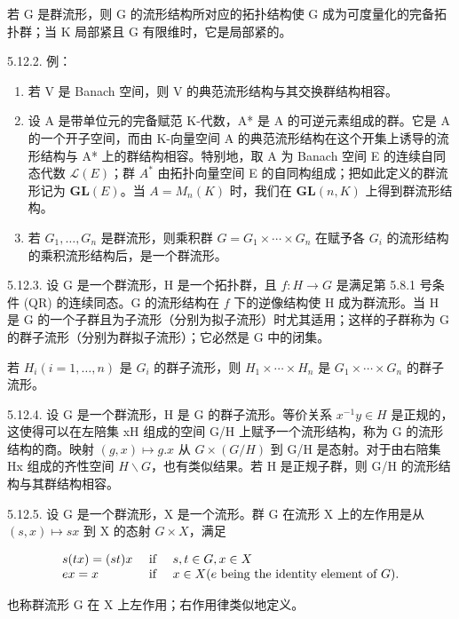 若 G 是群流形，则 G 的流形结构所对应的拓扑结构使 G 成为可度量化的完备拓扑群；当 K 局部紧且 G 有限维时，它是局部紧的。

5.12.2. 例：

\begin{enumerate}
\def\labelenumi{(\roman{enumi})}
\item
  若 V 是 Banach 空间，则 V 的典范流形结构与其交换群结构相容。
\item
  设 A 是带单位元的完备赋范 K-代数，A* 是 A 的可逆元素组成的群。它是 A 的一个开子空间，而由 K-向量空间 A 的典范流形结构在这个开集上诱导的流形结构与 A* 上的群结构相容。特别地，取 A 为 Banach 空间 E 的连续自同态代数 \(\mathcal{L}(E)\)；群 \(A^{*}\) 由拓扑向量空间 E 的自同构组成；把如此定义的群流形记为 \(\mathbf{GL}(E)\)。当 \(A = M_{n}(K)\) 时，我们在 \(\mathbf{GL}(n, K)\) 上得到群流形结构。
\item
  若 \(G_{1},\ldots,G_{n}\) 是群流形，则乘积群 \(G=G_{1}\times\cdots\times G_{n}\) 在赋予各 \(G_{i}\) 的流形结构的乘积流形结构后，是一个群流形。
\end{enumerate}

5.12.3. 设 G 是一个群流形，H 是一个拓扑群，且 \(f:H\to G\) 是满足第 5.8.1 号条件 (QR) 的连续同态。G 的流形结构在 \(f\) 下的逆像结构使 H 成为群流形。当 H 是 G 的一个子群且为子流形（分别为拟子流形）时尤其适用；这样的子群称为 G 的群子流形（分别为群拟子流形）；它必然是 G 中的闭集。

若 \(H_{i}(i=1,\ldots,n)\) 是 \(G_{i}\) 的群子流形，则 \(H_{1}\times\cdots\times H_{n}\) 是 \(G_{1}\times\cdots\times G_{n}\) 的群子流形。

5.12.4. 设 G 是一个群流形，H 是 G 的群子流形。等价关系 \(x^{-1}y \in H\) 是正规的，这使得可以在左陪集 xH 组成的空间 G/H 上赋予一个流形结构，称为 G 的流形结构的商。映射 \((g, x) \mapsto g.x\) 从 \(G \times (G/H)\) 到 G/H 是态射。对于由右陪集 Hx 组成的齐性空间 \(H\backslash G\)，也有类似结果。若 H 是正规子群，则 G/H 的流形结构与其群结构相容。

5.12.5. 设 G 是一个群流形，X 是一个流形。群 G 在流形 X 上的左作用是从 \((s, x) \mapsto sx\) 到 X 的态射 \(G \times X\)，满足

\[
\begin{array}{l l} s (t x) = (s t) x & \text { if } \quad s, t \in G, x \in X \\ e x = x & \text { if } \quad x \in X (e \text { being   the   identity   element   of } G). \end{array}
\]

也称群流形 G 在 X 上左作用；右作用律类似地定义。

